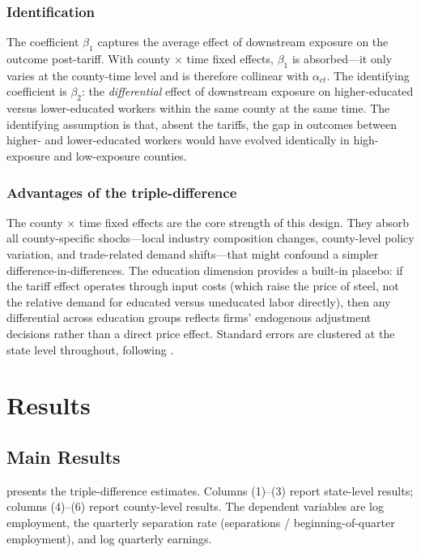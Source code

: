 \documentclass[12pt]{article}
\begin{document}
\subsubsection*{Identification} The coefficient $\beta_1$ captures the average effect of downstream exposure on the outcome post-tariff. With county $\times$ time fixed effects, $\beta_1$ is absorbed---it only varies at the county-time level and is therefore collinear with $\alpha_{ct}$. The identifying coefficient is $\beta_2$: the \emph{differential} effect of downstream exposure on higher-educated versus lower-educated workers within the same county at the same time. The identifying assumption is that, absent the tariffs, the gap in outcomes between higher- and lower-educated workers would have evolved identically in high-exposure and low-exposure counties.

\subsubsection*{Advantages of the triple-difference} The county $\times$ time fixed effects are the core strength of this design. They absorb all county-specific shocks---local industry composition changes, county-level policy variation, and trade-related demand shifts---that might confound a simpler difference-in-differences. The education dimension provides a built-in placebo: if the tariff effect operates through input costs (which raise the price of steel, not the relative demand for educated versus uneducated labor directly), then any differential across education groups reflects firms' endogenous adjustment decisions rather than a direct price effect. Standard errors are clustered at the state level throughout, following \citet{abadie2023}.

\section{Results}

\subsection{Main Results}

 presents the triple-difference estimates. Columns (1)--(3) report state-level results; columns (4)--(6) report county-level results. The dependent variables are log employment, the quarterly separation rate (separations / beginning-of-quarter employment), and log quarterly earnings.
\end{document}
